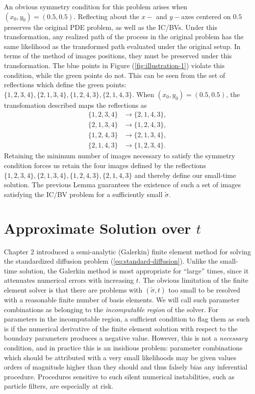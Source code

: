 \documentclass[10pt]{article}
\begin{document}
An obvious symmetry condition for this problem arises when
$(x_0, y_0) = (0.5, 0.5)$. Reflecting about the $x-$ and $y-$axes
centered on $0.5$ preserves the original PDE problem, as well as the
IC/BVs. Under this transformation, any realized path of the process in
the original problem has the same likelihood as the transformed path
evaluated under the original setup. In terms of the method of images
positions, they must be preserved under this transformation. The blue
points in Figure (\ref{fig:illustration-1}) violate this condition,
while the green points do not. This can be seen from the set of
reflections which define the green points:
$\{1,2,3,4 \},\{2,1,3,4 \},\{1,2,4,3 \},\{2,1,4,3 \}.$ When
$(x_0, y_0) = (0.5, 0.5)$, the transfomation described maps the
reflections as
\begin{align*}
  \{1,2,3,4 \} & \to \{2,1,4,3 \}, \\
  \{2,1,3,4 \} &\to \{1,2,4,3 \}, \\
  \{1,2,4,3 \} &\to \{2,1,3,4 \}, \\
  \{2,1,4,3 \} &\to \{1,2,3,4 \}.
\end{align*}
Retaining the minimum number of images necessary to satisfy the
symmetry condition forces us retain the four images defined by the
reflections $\{1,2,3,4 \},\{2,1,3,4 \},\{1,2,4,3 \},\{2,1,4,3 \}$ and
thereby define our small-time solution. The previous Lemma guarantees
the existence of such a set of images satisfying the IC/BV problem for
a sufficiently small $\tilde{\sigma}.$ 


\section{Approximate Solution over $t$}
Chapter 2 introduced a semi-analytic (Galerkin) finite element method
for solving the standardized diffusion problem
(\ref{eq:standard-diffusion}). Unlike the small-time solution, the
Galerkin method is most appropriate for ``large'' times, since it
attenuates numerical errors with increasing $t$. The obvious
limitation of the finite element solver is that there are problems
with $(\tilde{\sigma}, t)$ too small to be resolved with a reasonable
finite number of basis elements. We will call such parameter
combinations as belonging to the \textit{incomputable region} of the
solver. For parameters in the incomputable region, a sufficient
condition to flag them as such is if the numerical derivative of the
finite element solution with respect to the boundary parameters
produces a negative value. However, this is not a \textit{necessary}
condition, and in practice this is an insidious problem: parameter
combinations which should be attributed with a very small likelihoods
may be given values orders of magnitude higher than they should and
thus falsely bias any inferential procedure. Procedures sensitive to
such silent numerical instabilities, such as particle filters, are
especially at risk.
\end{document}
